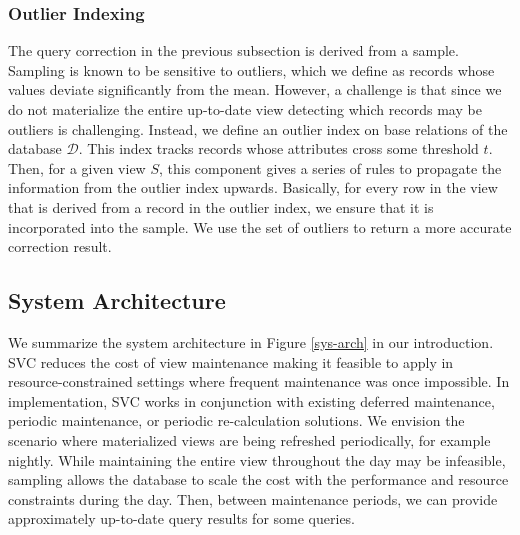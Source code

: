 \subsubsection{Outlier Indexing}
The query correction in the previous subsection is derived from a sample.
Sampling is known to be sensitive to outliers, which we define as records whose values deviate significantly from the mean.
However, a challenge is that since we do not materialize the entire up-to-date view detecting which records may be outliers is challenging.
Instead, we define an outlier index on base relations of the database $\mathcal{D}$.
This index tracks records whose attributes cross some threshold $t$.
Then, for a given view $S$, this component gives a series of rules to propagate the information from the outlier index upwards.
Basically, for every row in the view that is derived from a record in the outlier index, we ensure that it is incorporated into the sample.
We use the set of outliers to return a more accurate correction result.

\subsection{System Architecture}
We summarize the system architecture in Figure \ref{sys-arch} in our introduction.
SVC reduces the cost of view maintenance making it feasible to apply in resource-constrained settings where frequent maintenance was once impossible.
In implementation, SVC works in conjunction with existing deferred maintenance, periodic maintenance, or periodic re-calculation solutions.
We envision the scenario where materialized views are being refreshed periodically, for example nightly.
While maintaining the entire view throughout the day may be infeasible, sampling allows the database to scale the cost with the performance and resource constraints during the day.
Then, between maintenance periods, we can provide approximately up-to-date query results for some queries.

 
